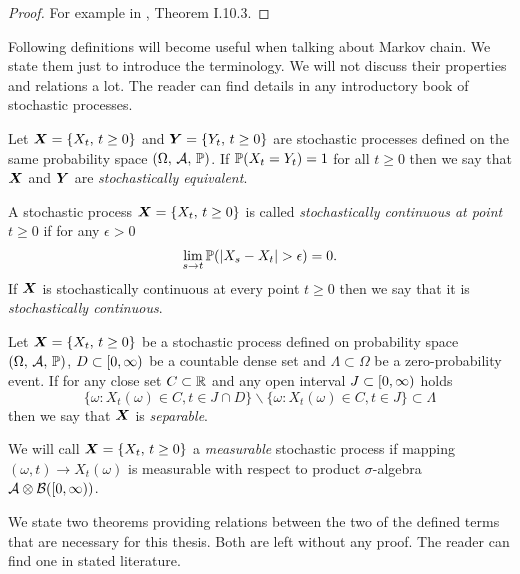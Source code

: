 \begin{proof}
	For example in \cite{Stepan87}, Theorem I.10.3.
\end{proof}

Following definitions will become useful when talking about Markov chain. We state them just to introduce the terminology. We will not discuss their properties and relations a lot. The reader can find details in any introductory book of stochastic processes.

\begin{definition}\label{stochEquiv}
	Let $\bm{X} = \{ X_t ,\, t \geq 0 \}$ and $\bm{Y} = \{ Y_t ,\, t \geq 0 \}$ are stochastic processes defined on the same probability space $(\Omega ,\, \mathcal{A} ,\, \operatorname{\mathbb{P}})$. If $\operatorname{\mathbb{P}} (X_t = Y_t) = 1$ for all $t \geq 0$ then we say that $\bm{X}$ and $\bm{Y}$ are \emph{stochastically equivalent}.
\end{definition}

\begin{definition}\label{stochCont}
	A stochastic process $\bm{X} = \{ X_t ,\, t \geq 0 \}$ is called \emph{stochastically continuous at point} $t \geq 0$ if for any $\epsilon > 0$
	\[
		\lim_{s \to t} \operatorname{\mathbb{P}} (\vert X_s - X_t \vert > \epsilon ) = 0.
	\]
	If $\bm{X}$ is stochastically continuous at every point $t \geq 0$ then we say that it is \emph{stochastically continuous}.
\end{definition}

\begin{definition}\label{separProc}
	Let $\bm{X} = \{ X_t ,\, t \geq 0 \}$ be a stochastic process defined on probability space $(\Omega ,\, \mathcal{A} ,\, \operatorname{\mathbb{P}})$, $D \subset [0, \infty)$ be a countable dense set and $\Lambda \subset \Omega$ be a zero-probability event. If for any close set $C \subset \mathbb{R}$ and any open interval $J \subset [0, \infty)$ holds
	\[
		\{ \omega: X_t(\omega) \in C, t \in J \cap D \}
		\backslash
		\{ \omega: X_t(\omega) \in C, t \in J \}
		\subset \Lambda
	\]
	then we say that $\bm{X}$ is \emph{separable}.
\end{definition}

\begin{definition}\label{measurProc}
	We will call $\bm{X} = \{ X_t ,\, t \geq 0 \}$ a \emph{measurable} stochastic process if mapping $(\omega, t) \to X_t(\omega)$ is measurable with respect to product $\sigma$-algebra $\mathcal{A} \otimes \mathcal{B}([0, \infty))$.
\end{definition}

We state two theorems providing relations between the two of the defined terms that are necessary for this thesis. Both are left without any proof. The reader can find one in stated literature.


